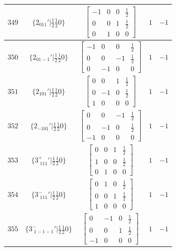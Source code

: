 \documentclass[fleqn,8pt]{jsarticle}
\begin{document}
\begin{longtable}{ccccc}
$ 349 $ & $ \{2{}_{011}{}'|\frac{1}{2} \frac{1}{2} 0\} $ & $ \begin{bmatrix} -1 & 0 & 0 & \frac{1}{2} \\ 0 & 0 & 1 & \frac{1}{2} \\ 0 & 1 & 0 & 0 \end{bmatrix} $ & $ 1 $ & $ -1 $ \\ \hline
$ 350 $ & $ \{2{}_{01-1}{}'|\frac{1}{2} \frac{1}{2} 0\} $ & $ \begin{bmatrix} -1 & 0 & 0 & \frac{1}{2} \\ 0 & 0 & -1 & \frac{1}{2} \\ 0 & -1 & 0 & 0 \end{bmatrix} $ & $ 1 $ & $ -1 $ \\ \hline
$ 351 $ & $ \{2{}_{101}{}'|\frac{1}{2} \frac{1}{2} 0\} $ & $ \begin{bmatrix} 0 & 0 & 1 & \frac{1}{2} \\ 0 & -1 & 0 & \frac{1}{2} \\ 1 & 0 & 0 & 0 \end{bmatrix} $ & $ 1 $ & $ -1 $ \\ \hline
$ 352 $ & $ \{2{}_{-101}{}'|\frac{1}{2} \frac{1}{2} 0\} $ & $ \begin{bmatrix} 0 & 0 & -1 & \frac{1}{2} \\ 0 & -1 & 0 & \frac{1}{2} \\ -1 & 0 & 0 & 0 \end{bmatrix} $ & $ 1 $ & $ -1 $ \\ \hline
$ 353 $ & $ \{3^{+}_{\,\,111}{}'|\frac{1}{2} \frac{1}{2} 0\} $ & $ \begin{bmatrix} 0 & 0 & 1 & \frac{1}{2} \\ 1 & 0 & 0 & \frac{1}{2} \\ 0 & 1 & 0 & 0 \end{bmatrix} $ & $ 1 $ & $ -1 $ \\ \hline
$ 354 $ & $ \{3^{-}_{\,\,111}{}'|\frac{1}{2} \frac{1}{2} 0\} $ & $ \begin{bmatrix} 0 & 1 & 0 & \frac{1}{2} \\ 0 & 0 & 1 & \frac{1}{2} \\ 1 & 0 & 0 & 0 \end{bmatrix} $ & $ 1 $ & $ -1 $ \\ \hline
$ 355 $ & $ \{3^{-}_{\,\,1-1-1}{}'|\frac{1}{2} \frac{1}{2} 0\} $ & $ \begin{bmatrix} 0 & -1 & 0 & \frac{1}{2} \\ 0 & 0 & 1 & \frac{1}{2} \\ -1 & 0 & 0 & 0 \end{bmatrix} $ & $ 1 $ & $ -1 $ \\ \hline

\end{longtable}
\end{document}
